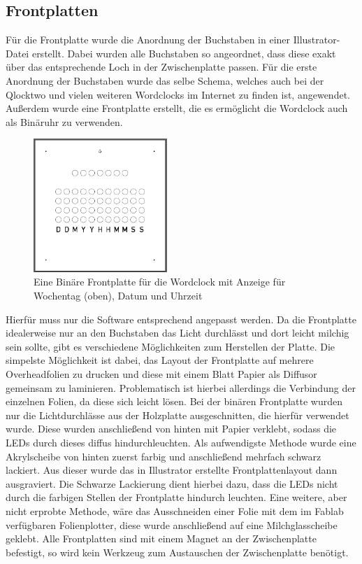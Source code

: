 \documentclass[12pt,journal,compsoc]{IEEEtran}
\begin{document}
\subsection{Frontplatten}
Für die Frontplatte wurde die Anordnung der Buchstaben in einer Illustrator-Datei erstellt. Dabei wurden alle Buchstaben so angeordnet, dass diese exakt über das entsprechende Loch in der Zwischenplatte passen. Für die erste Anordnung der Buchstaben wurde das selbe Schema, welches auch bei der Qlocktwo und vielen weiteren Wordclocks im Internet zu finden ist, angewendet. Außerdem wurde eine Frontplatte erstellt, die es ermöglicht die Wordclock auch als Binäruhr zu verwenden. 
\begin{figure}[h]
	\centering
	\includegraphics[width=0.45\textwidth]{Bilder/Frontplatte2}
	\caption{Eine Binäre Frontplatte für die Wordclock mit Anzeige für Wochentag (oben), Datum und Uhrzeit} 
	\label{fig:Frontplatte2}
\end{figure}
Hierfür muss nur die Software entsprechend angepasst werden. Da die Frontplatte idealerweise  nur an den Buchstaben das Licht durchlässt und dort leicht milchig sein sollte, gibt es  verschiedene Möglichkeiten zum Herstellen der Platte. Die simpelste Möglichkeit ist dabei, das Layout der Frontplatte auf mehrere Overheadfolien zu drucken und diese mit einem Blatt Papier als Diffusor gemeinsam zu laminieren. Problematisch ist hierbei allerdings die Verbindung der einzelnen Folien, da diese sich leicht lösen. Bei der binären Frontplatte wurden nur die Lichtdurchlässe aus der Holzplatte ausgeschnitten, die hierfür verwendet wurde. Diese wurden anschließend von hinten mit Papier verklebt, sodass die LEDs durch dieses diffus hindurchleuchten. Als aufwendigste Methode wurde  eine Akrylscheibe von hinten zuerst farbig und anschließend mehrfach schwarz lackiert. Aus dieser wurde das in Illustrator erstellte Frontplattenlayout dann ausgraviert. Die Schwarze Lackierung dient hierbei dazu, dass die LEDs nicht durch die farbigen Stellen der Frontplatte hindurch leuchten. Eine weitere, aber nicht erprobte Methode, wäre das Ausschneiden einer Folie mit dem im Fablab verfügbaren Folienplotter, diese wurde anschließend auf eine Milchglasscheibe geklebt. Alle Frontplatten sind mit einem Magnet an der Zwischenplatte befestigt, so wird kein Werkzeug zum Austauschen der Zwischenplatte benötigt.
\end{document}
